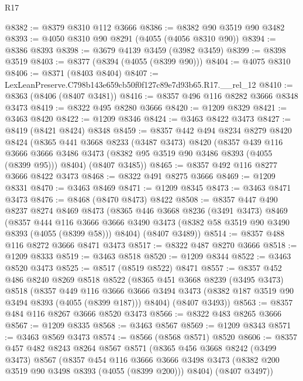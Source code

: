 \begin{lexlean}{R17}
\begin{coremodule}
@8382 := @8379 @8310 @112 @3666
@8386 := @8382 @90 @3519 @90 @3482
@8393 := @4050 @8310 @90 @8291 (@4055 (@4056 @8310 @90))
@8394 := @8386 @8393
@8398 := @3679 @4139 @3459 (@3982 @3459)
@8399 := @8398 @3519
@8403 := @8377 (@8394 (@4055 (@8399 @90)))
@8404 := @4075 @8310
@8406 := @8371 (@8403 @8404)
@8407 := LexLeanPreserve.C798b143e659cb50f0f127c89e7d93b65.R17.__rel_12
@8410 := @8363 (@8406 (@8407 @3481))
@8416 := @8357 @496 @116 @8282 @3666 @8348 @3473
@8419 := @8322 @495 @8280 @3666
@8420 := @1209 @8329
@8421 := @3463 @8420
@8422 := @1209 @8346
@8424 := @3463 @8422 @3473
@8427 := @8419 (@8421 @8424) @8348
@8459 := @8357
    @442
    @494
    @8234
    @8279
    @8420
    @8424
    (@8365
      @441
      @3668
      @8233
      (@3487 @3473)
      @8420
      (@8357
        @439
        @116
        @3666
        @3666
        @3486
        @3473
        (@8382 @95 @3519 @90 @3486 @8393 (@4055 (@8399 @95)))
        @8404)
      (@8407 @3485))
@8465 := @8357 @492 @116 @8277 @3666 @8422 @3473
@8468 := @8322 @491 @8275 @3666
@8469 := @1209 @8331
@8470 := @3463 @8469
@8471 := @1209 @8345
@8473 := @3463 @8471 @3473
@8476 := @8468 (@8470 @8473) @8422
@8508 := @8357
    @447
    @490
    @8237
    @8274
    @8469
    @8473
    (@8365
      @446
      @3668
      @8236
      (@3491 @3473)
      @8469
      (@8357
        @444
        @116
        @3666
        @3666
        @3490
        @3473
        (@8382 @58 @3519 @90 @3490 @8393 (@4055 (@8399 @58)))
        @8404)
      (@8407 @3489))
@8514 := @8357 @488 @116 @8272 @3666 @8471 @3473
@8517 := @8322 @487 @8270 @3666
@8518 := @1209 @8333
@8519 := @3463 @8518
@8520 := @1209 @8344
@8522 := @3463 @8520 @3473
@8525 := @8517 (@8519 @8522) @8471
@8557 := @8357
    @452
    @486
    @8240
    @8269
    @8518
    @8522
    (@8365
      @451
      @3668
      @8239
      (@3495 @3473)
      @8518
      (@8357
        @449
        @116
        @3666
        @3666
        @3494
        @3473
        (@8382 @187 @3519 @90 @3494 @8393 (@4055 (@8399 @187)))
        @8404)
      (@8407 @3493))
@8563 := @8357 @484 @116 @8267 @3666 @8520 @3473
@8566 := @8322 @483 @8265 @3666
@8567 := @1209 @8335
@8568 := @3463 @8567
@8569 := @1209 @8343
@8571 := @3463 @8569 @3473
@8574 := @8566 (@8568 @8571) @8520
@8606 := @8357
    @457
    @482
    @8243
    @8264
    @8567
    @8571
    (@8365
      @456
      @3668
      @8242
      (@3499 @3473)
      @8567
      (@8357
        @454
        @116
        @3666
        @3666
        @3498
        @3473
        (@8382 @200 @3519 @90 @3498 @8393 (@4055 (@8399 @200)))
        @8404)
      (@8407 @3497))

\end{coremodule}
\end{lexlean}
